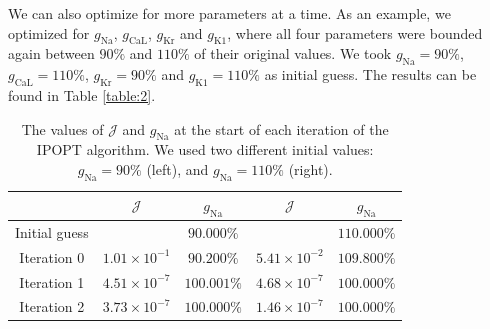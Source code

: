 \documentclass{article}
\begin{document}
We can also optimize for more parameters at a time. As an example, we optimized for $g_{\mathrm{Na}}$, $g_{\mathrm{CaL}}$, $g_{\mathrm{Kr}}$ and $g_{\mathrm{K1}}$, where all four parameters were bounded again between $90\%$ and $110\%$ of their original values. We took $g_{\mathrm{Na}}=90\%$, $g_{\mathrm{CaL}}=110\%$, $g_{\mathrm{Kr}}=90\%$ and $g_{\mathrm{K1}}=110\%$ as initial guess. The results can be found in Table \ref{table:2}.
\begin{table}
\begin{center}
  \begin{tabular}{c || c c | c c }
   &   $\mathcal{J}$ & $g_{\mathrm{Na}}$ & $\mathcal{J}$ & $g_{\mathrm{Na}}$  \\ 
    \hline
   Initial guess &  
    & $90.000 \%$  &  
    & $110.000 \%$  \\
   Iteration 0  & $1.01 \times 10^{-1}$  & $90.200 \%$  &  $5.41 \times 10^{-2}$ & $109.800 \%$  \\
   Iteration 1  & $4.51 \times 10^{-7}$  & $100.001 \%$  &  $4.68 \times 10^{-7}$ & $100.000 \%$  \\
    Iteration 2  &$3.73 \times 10^{-7}$  & $100.000 \%$  &  $1.46 \times 10^{-7}$ & $100.000 \%$  \\
  \end{tabular}
\end{center}
\caption{The values of $\mathcal{J}$ and $g_{\mathrm{Na}}$ at the start of each iteration of the IPOPT algorithm. We used two different initial values: $g_{\mathrm{Na}}=90\%$ (left), and $g_{\mathrm{Na}}=110\%$ (right).}
\label{table:1}
\end{table}
\end{document}
